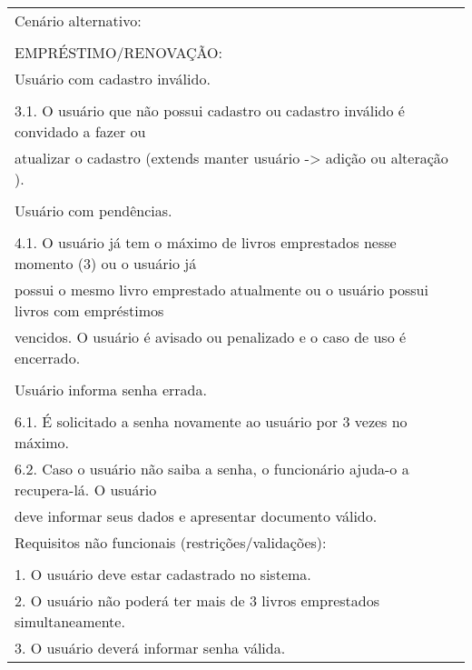 \begin{longtable}{|l|}
Cenário alternativo:\\ \\ EMPRÉSTIMO/RENOVAÇÃO:\\ Usuário com cadastro inválido.\\        \\ 3.1. O usuário que não possui cadastro ou cadastro inválido é convidado a fazer ou  \\ atualizar o cadastro (extends manter usuário -> adição ou alteração ).\\ \\Usuário com pendências.\\ \\4.1. O usuário já tem o máximo de livros emprestados nesse momento (3) ou o usuário já\\ possui o mesmo livro emprestado atualmente ou o usuário possui livros com empréstimos\\ vencidos. O usuário é avisado ou penalizado e o caso de uso é encerrado.\\  \\Usuário informa senha errada.\\ \\6.1. É solicitado a senha novamente ao usuário por 3 vezes no máximo.\\ 6.2. Caso o usuário não saiba a senha, o funcionário ajuda-o a recupera-lá. O usuário\\ deve informar seus dados e apresentar documento válido.\\ \hline
Requisitos não funcionais (restrições/validações):\\ \\         1. O usuário deve estar cadastrado no sistema.\\         2. O usuário não poderá ter mais de 3 livros emprestados simultaneamente.\\         3. O usuário deverá informar senha válida. \hline
\end{longtable}

